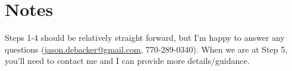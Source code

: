 \documentclass[article,11pt,letterpaper,fleqn]{article}
\theoremstyle{definition}
\numberwithin{equation}{section}
\begin{document}
\section{Notes}
\label{sec:notes}

Steps 1-4 should be relatively straight forward, but I'm happy to answer any questions (\href{mailto:jason.debacker@gmail.com}{jason.debacker@gmail.com}, 770-289-0340).  When we are at Step 5, you'll need to contact me and I can provide more details/guidance.


\end{document}
